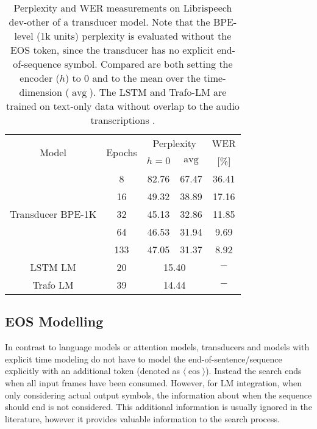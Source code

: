 \documentclass[a4paper]{article}
\newcommand{\eos}{\ensuremath{\langle\operatorname{eos}\rangle}}
\newcommand{\ilmAvgName}{\ensuremath{\operatorname{avg}}}
\begin{document}
\begin{table}[t]
\centering
\caption[Internal LM estimation on Librispeech]{Perplexity and WER measurements on Librispeech dev-other of a transducer model.
Note that the BPE-level (1k units) perplexity is evaluated without the EOS token, since the transducer has no explicit end-of-sequence symbol.
Compared are both setting the encoder ($h$) to $0$ and to the mean over the time-dimension (\ilmAvgName).
The LSTM and Trafo-LM are trained on text-only data without overlap to
the audio transcriptions \cite{panayotov2015librispeech}.
}
\label{tab:internal_lm_estimation}
\begin{tabular}{|c|c|c|c|c|}
\hline
\multirow{2}{*}{Model} & \multirow{2}{*}{Epochs} & \multicolumn{2}{c|}{Perplexity} & WER\\
 &  & $h=0$ & \ilmAvgName & [\%]\\
\hline\hline
\multirow{5}{*}{Transducer BPE-1K} & 8 & 82.76 & 67.47 & 36.41\\
\cline{2-5}
& 16 & 49.32 & 38.89 & 17.16\\
\cline{2-5}
& 32 & 45.13 & 32.86 & 11.85\\
\cline{2-5}
& 64 & 46.53 & 31.94 & \phantom{0}9.69\\
\cline{2-5}
& 133 & 47.05 & 31.37 & \phantom{0}8.92\\
\hline
LSTM LM & 20 & \multicolumn{2}{c|}{15.40} & $-$\\
\hline
Trafo LM & 39 & \multicolumn{2}{c|}{14.44} & $-$\\
\hline
\end{tabular}
\end{table}















\subsection{EOS Modelling}
\label{sec:lm_eos_modelling}

In contrast to language models or attention models,
transducers and models with explicit time modeling
do not have to model the end-of-sentence/sequence explicitly
with an additional token (denoted as \eos).
Instead the search ends when all input frames have been consumed.
However, for LM integration, when only considering actual output symbols,
the information about when the sequence should end is not considered.
This additional information is usually ignored in the literature,
however it provides valuable information to the search process.
\end{document}
